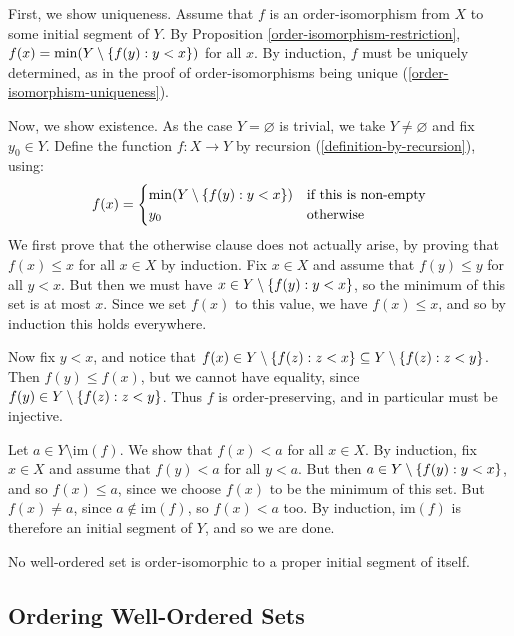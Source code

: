 \documentclass{article}
\begin{document}
\begin{prf}
    First, we show uniqueness. Assume that $f$ is an order-isomorphism from $X$ to some initial segment of $Y$. By Proposition \ref{order-isomorphism-restriction}, $f(x) = \min(Y \setminus \left\lbrace f(y) : y < x \right\rbrace)$ for all $x$. By induction, $f$ must be uniquely determined, as in the proof of order-isomorphisms being unique (\ref{order-isomorphism-uniqueness}).
    
    Now, we show existence. As the case $Y = \varnothing$ is trivial, we take $Y \neq \varnothing$ and fix $y_0 \in Y$. Define the function $f: X \to Y$ by recursion (\ref{definition-by-recursion}), using:
    \[
	f(x) = \begin{cases}
		 \min(Y \setminus \left\lbrace f(y) : y < x \right\rbrace) & \text{if this is non-empty} \\
		 y_0 & \!\mathrel{\, \text{otherwise}}
	\end{cases}
	\]
	We first prove that the otherwise clause does not actually arise, by proving that $f(x) \leq x$ for all $x \in X$ by induction. Fix $x \in X$ and assume that $f(y) \leq y$ for all $y < x$. But then we must have $x \in Y \setminus \left\lbrace f(y) : y < x \right\rbrace$, so the minimum of this set is at most $x$. Since we set $f(x)$ to this value, we have $f(x) \leq x$, and so by induction this holds everywhere.
	
	Now fix $y < x$, and notice that $f(x) \in Y \setminus \left\lbrace f(z): z < x \right\rbrace \subseteq Y \setminus \left\lbrace f(z): z < y \right\rbrace$. Then $f(y) \leq f(x)$, but we cannot have equality, since $f(y) \in Y \setminus \left\lbrace f(z): z < y \right\rbrace$. Thus $f$ is order-preserving, and in particular must be injective.
	
	Let $a \in Y \setminus \mathrm{im}(f)$. We show that $f(x) < a$ for all $x \in X$. By induction, fix $x \in X$ and assume that $f(y) < a$ for all $y < a$. But then $a \in Y \setminus \left\lbrace f(y) : y < x \right\rbrace$, and so $f(x) \leq a$, since we choose $f(x)$ to be the minimum of this set. But $f(x) \neq a$, since $a \notin \mathrm{im}(f)$, so $f(x) < a$ too. By induction, $\mathrm{im}(f)$ is therefore an initial segment of $Y$, and so we are done.
\end{prf}

\begin{corollary}
    No well-ordered set is order-isomorphic to a proper initial segment of itself.
\end{corollary}


\subsection{Ordering Well-Ordered Sets}
\label{section-ordinals-ordering-well-ordered-sets}
\end{document}
